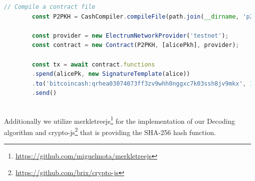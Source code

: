 \documentclass{cacthesis}
\begin{document}
        \begin{lstlisting}[language=JavaScript, basicstyle=\footnotesize, caption= Compiling and executing CashScript \textit{P2PKH} via JavaScript , captionpos=b, backgroundcolor=\color{backcolour}, label=lst:cashScriptInUse]
        // Compile a contract file
        const P2PKH = CashCompiler.compileFile(path.join(__dirname, 'p2pkh.cash'));

        const provider = new ElectrumNetworkProvider('testnet');
        const contract = new Contract(P2PKH, [alicePkh], provider);
        
        const tx = await contract.functions
        .spend(alicePk, new SignatureTemplate(alice))
        .to('bitcoincash:qrhea03074073ff3zv9whh0nggxc7k03ssh8jv9mkx', 10000)
        .send()
        \end{lstlisting} \\
	    
	    Additionally we utilize merkletreejs\footnote{\url{https://github.com/miguelmota/merkletreejs}} for the implementation of our Decoding algorithm and crypto-js\footnote{\url{https://github.com/brix/crypto-js}} that is providing the SHA-256 hash function.
	    
	    
\end{document}
